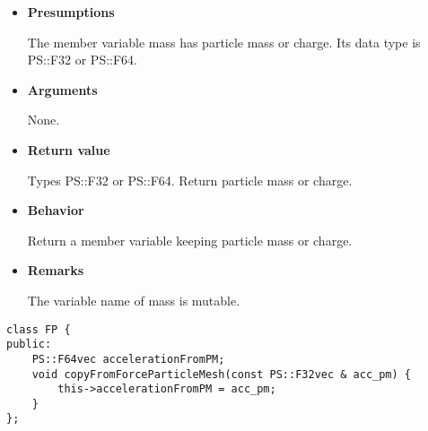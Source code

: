 \begin{itemize}

\item {\bf Presumptions}

  The member variable mass has particle mass or charge. Its data type
  is PS::F32 or PS::F64.

\item {\bf Arguments}

  None.

\item {\bf Return value}

  Types PS::F32 or PS::F64. Return particle mass or charge.
  
\item {\bf Behavior}

  Return a member variable keeping particle mass or charge.

\item {\bf Remarks}

  The variable name of mass is mutable.

\end{itemize}



\begin{screen}
\begin{verbatim}
class FP {
public:
    PS::F64vec accelerationFromPM;
    void copyFromForceParticleMesh(const PS::F32vec & acc_pm) {
        this->accelerationFromPM = acc_pm;
    }
};
\end{verbatim}
\end{screen}

